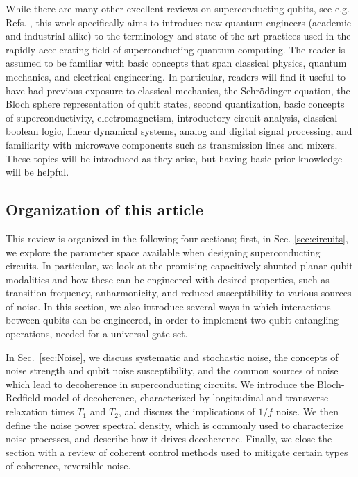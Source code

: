 \documentclass[aip,apr,twocolumn,showpacs,superscriptaddress,groupedaddress,nofootinbib,reprint]{revtex4-1}  %
\begin{document}
While there are many other excellent reviews on superconducting qubits, see e.g. Refs. , this work specifically aims to introduce new quantum engineers (academic and industrial alike) to the terminology and state-of-the-art practices used in the rapidly accelerating field of superconducting quantum computing. The reader is assumed to be familiar with basic concepts that span classical physics, quantum mechanics, and electrical engineering. In particular, readers will find it useful to have had previous exposure to classical mechanics, the Schr\"odinger equation, the Bloch sphere representation of qubit states, second quantization, basic concepts of superconductivity, electromagnetism, introductory circuit analysis, classical boolean logic, linear dynamical systems, analog and digital signal processing, and familiarity with microwave components such as transmission lines and mixers. These topics will be introduced as they arise, but having basic prior knowledge will be helpful.

\subsection{Organization of this article}
This review is organized in the following four sections; first, in Sec. \ref{sec:circuits}, we explore the parameter space available when designing superconducting circuits. In particular, we look at the promising capacitively-shunted planar qubit modalities and how these can be engineered with desired properties, such as transition frequency, anharmonicity, and reduced susceptibility to various sources of noise. In this section, we also introduce several ways in which interactions between qubits can be engineered, in order to implement two-qubit entangling operations, needed for a universal gate set.

In Sec.~\ref{sec:Noise}, we discuss systematic and stochastic noise, the concepts of noise strength and qubit noise susceptibility, and the common sources of noise which lead to decoherence in superconducting circuits. We introduce the Bloch-Redfield model of decoherence, characterized by longitudinal and transverse relaxation times $T_1$ and $T_2$, and discuss the implications of $1/f$ noise. We then define the noise power spectral density, which is commonly used to characterize noise processes, and describe how it drives decoherence. Finally, we close the section with a review of coherent control methods used to mitigate certain types of coherence, reversible noise.
\end{document}
